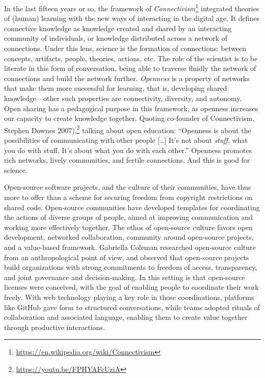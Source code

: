 \documentclass{statement}
\newlength{\up}
\begin{document}
In the last fifteen years or so, the framework of \emph{Connectivism}\footnote{\url{https://en.wikipedia.org/wiki/Connectivism}} integrated theories of (human) learning with the new ways of interacting in the digital age. 
It defines connective knowledge as knowledge created and shared by an interacting community of individuals, or knowledge distributed across a network of connections. 
Under this lens, science is the formation of connections: between concepts, artifacts, people, theories, actions, etc. 
The role of the scientist is to be literate in this form of conversation, being able to traverse fluidly the network of connections and build the network further. 
\emph{Openness} is a property of networks that make them more successful for learning, that is, developing shared knowledge---other such properties are connectivity, diversity, and autonomy. 
Open sharing has a pedagogical purpose in this framework, as openness increases our capacity to create knowledge together. 
Quoting co-founder of Connectivism, Stephen Downes  2007),\footnote{\url{https://youtu.be/FPHYAFcUziA}} talking about open education: 
``Openness is about the possibilities of communicating with other people […] It’s not about \emph{stuff}, what you do with stuff. It’s about what you do with each other.'' 
Openness promotes rich networks, lively communities, and fertile connections. 
And this is good for science.

Open-source software projects, and the culture of their communities, have thus more to offer than a scheme for securing freedom from copyright restrictions on shared code. 
Open-source communities have developed templates for coordinating the actions of diverse groups of people, aimed at improving communication and working more effectively together. 
The ethos of open-source culture favors open development, networked collaboration, community around open-source projects, and a value-based framework. 
Gabriella Coleman \citep{coleman2012} researched open-source culture from an anthropological point of view, and observed that open-source projects build organizations with strong commitments to freedom of access, transparency, and joint governance and decision-making. 
In this setting is that open-source licenses were conceived, with the goal of enabling people to coordinate their work freely. 
With web technology playing a key role in those coordinations, platforms like GitHub gave form to structured conversations, while teams adopted rituals of collaboration and associated language, enabling them to create value together through productive interactions.
\end{document}
